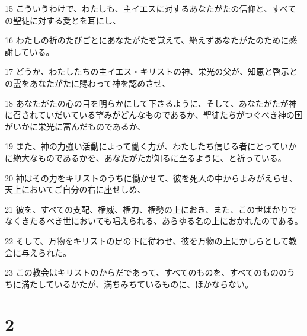 \par 15 こういうわけで、わたしも、主イエスに対するあなたがたの信仰と、すべての聖徒に対する愛とを耳にし、
\par 16 わたしの祈のたびごとにあなたがたを覚えて、絶えずあなたがたのために感謝している。
\par 17 どうか、わたしたちの主イエス・キリストの神、栄光の父が、知恵と啓示との霊をあなたがたに賜わって神を認めさせ、
\par 18 あなたがたの心の目を明らかにして下さるように、そして、あなたがたが神に召されていだいている望みがどんなものであるか、聖徒たちがつぐべき神の国がいかに栄光に富んだものであるか、
\par 19 また、神の力強い活動によって働く力が、わたしたち信じる者にとっていかに絶大なものであるかを、あなたがたが知るに至るように、と祈っている。
\par 20 神はその力をキリストのうちに働かせて、彼を死人の中からよみがえらせ、天上においてご自分の右に座せしめ、
\par 21 彼を、すべての支配、権威、権力、権勢の上におき、また、この世ばかりでなくきたるべき世においても唱えられる、あらゆる名の上におかれたのである。
\par 22 そして、万物をキリストの足の下に従わせ、彼を万物の上にかしらとして教会に与えられた。
\par 23 この教会はキリストのからだであって、すべてのものを、すべてのもののうちに満たしているかたが、満ちみちているものに、ほかならない。

\chapter{2}

